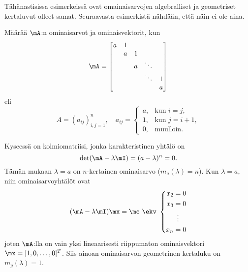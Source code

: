 Tähänastisissa esimerkeissä ovat omainaisarvojen algebralliset ja geometriset kertaluvut olleet
samat. Seuraavasta esimerkistä nähdään, että näin ei ole aina.
\begin{Exa} \label{eig-ex4} Määrää $\mA$:n ominaisarvot ja ominaisvektorit, kun
\[
\mA=\begin{bmatrix} 
    a & 1 \\ & a & 1 \\ & & a & \ddots \\ & & & \ddots & 1 \\ & & & & a 
    \end{bmatrix}
\]
eli
\[
A=(a_{ij})_{i,j=1}^n,\quad a_{ij}
 = \begin{cases} 
   \,a, &\text{kun } i=j, \\ \,1, &\text{kun } j=i+1, \\ \,0, &\text{muulloin}.
   \end{cases}
\]
\end{Exa}
\ratk Kyseessä on kolmiomatriisi, jonka karakteristinen yhtälö on
\[
\det(\mA-\lambda\mI)=(a-\lambda)^n=0.
\]
Tämän mukaan $\lambda=a$ on $n$-kertainen ominaisarvo ($m_a(\lambda)=n$). Kun $\lambda=a$, niin
ominaisarvoyhtälöt ovat
\[
(\mA-\lambda\mI)\mx=\mo \ \ekv \ \left\{ \begin{aligned}
x_2 &= 0 \\
x_3 &= 0 \\
& \ \, \vdots \\
x_n &= 0
\end{aligned} \right.
\]
joten $\mA$:lla on vain yksi lineaarisesti riippumaton ominaisvektori $\mx=[1,0,\ldots,0]^T$. 
Siis ainoan ominaisarvon geometrinen kertaluku on $m_g(\lambda)=1$. \loppu

